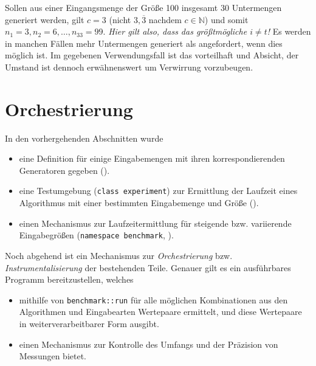 Sollen aus einer Eingangsmenge der Größe 100 insgesamt 30 Untermengen generiert werden, gilt $c = 3$ (nicht $3,\overline{3}$ nachdem $c \in \mathbb{N}$) und somit $n_1 = 3, n_2 = 6, \ldots, n_{33} = 99$. \emph{Hier gilt also, dass das größtmögliche $i \neq t$!} Es werden in manchen Fällen mehr Untermengen generiert als angefordert, wenn dies möglich ist. Im gegebenen Verwendungsfall ist das vorteilhaft und Absicht, der Umstand ist dennoch erwähnenswert um Verwirrung vorzubeugen.

\section{Orchestrierung}

In den vorhergehenden Abschnitten wurde

\begin{itemize}
    \item eine Definition für einige Eingabemengen mit ihren korrespondierenden Generatoren gegeben ().
    \item eine Testumgebung (\lstinline{class experiment}) zur Ermittlung der Laufzeit eines Algorithmus mit einer bestimmten Eingabemenge und Größe ().
    \item einen Mechanismus zur Laufzeitermittlung für steigende bzw. variierende Eingabegrößen (\lstinline{namespace benchmark}, ).
\end{itemize}

Noch abgehend ist ein Mechanismus zur \emph{Orchestrierung} bzw. \emph{Instrumentalisierung} der bestehenden Teile. Genauer gilt es ein ausführbares Programm bereitzustellen, welches

\begin{itemize}
    \item mithilfe von \lstinline{benchmark::run} für alle möglichen Kombinationen aus den Algorithmen und Eingabearten Wertepaare ermittelt, und diese Wertepaare in weiterverarbeitbarer Form ausgibt.

    \item einen Mechanismus zur Kontrolle des Umfangs und der Präzision von Messungen bietet.
\end{itemize}

